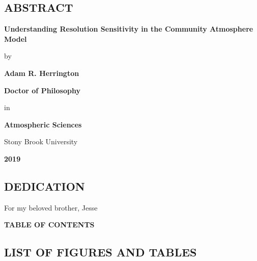 \documentclass[12pt]{article}
\makeatletter
\renewcommand{\tableofcontents}{%
  \@starttoc{toc}%
}
\makeatother
\begin{document}
\newpage
\doublespacing
\begin{center}
\section*{\bf{\normalsize ABSTRACT}}
\end{center}
\vspace*{1\baselineskip}
\centerline{\bf{{Understanding Resolution Sensitivity in the Community Atmosphere Model}}}
\vspace*{1\baselineskip}
\centerline{by}
\vspace*{1\baselineskip}
\centerline{\bf{Adam R. Herrington}}
\vspace*{1\baselineskip}
\centerline{\bf{Doctor of Philosophy}}
\vspace*{1\baselineskip}
\centerline{in}
\vspace*{1\baselineskip}
\centerline{\bf{Atmospheric Sciences}}
\vspace*{1\baselineskip}
\centerline{Stony Brook University}
\vspace*{1\baselineskip}
\centerline{\bf{2019}}
\vspace*{2\baselineskip}


\newpage
\begin{center}
\section*{\bf{\normalsize DEDICATION}}
\end{center}
\vspace*{4\baselineskip}
For my beloved brother, Jesse

\newpage
\centerline{\bf{\normalsize TABLE OF CONTENTS}}
\tableofcontents


\newpage
\begin{center}
\section*{\bf{\normalsize LIST OF FIGURES AND TABLES}}
\end{center}
\vspace*{4\baselineskip}
\listoffigures 
\listoftables
\end{document}
